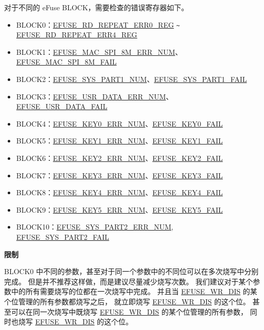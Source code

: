 \documentclass[main\_\_CN.tex]{subfiles}
\begin{document}
\begin{enumerate}
对于不同的 eFuse BLOCK，需要检查的错误寄存器如下。
\begin{itemize}
    \item BLOCK0：\hyperref[regdesc:EFUSERDREPEATERR0REG]{EFUSE\_RD\_REPEAT\_ERR0\_REG} \verb+~+ \hyperref[regdesc:EFUSERDREPEATERR4REG]{EFUSE\_RD\_REPEAT\_ERR4\_REG}
    \item BLOCK1：\hyperref[fielddesc:EFUSEMACSPI8MERRNUM]{EFUSE\_MAC\_SPI\_8M\_ERR\_NUM}、\hyperref[fielddesc:EFUSEMACSPI8MFAIL]{EFUSE\_MAC\_SPI\_8M\_FAIL}
    \item BLOCK2：\hyperref[fielddesc:EFUSESYSPART1NUM]{EFUSE\_SYS\_PART1\_NUM}、\hyperref[fielddesc:EFUSESYSPART1FAIL] {EFUSE\_SYS\_PART1\_FAIL}
    \item BLOCK3：\hyperref[fielddesc:EFUSEUSRDATAERRNUM] {EFUSE\_USR\_DATA\_ERR\_NUM}、\hyperref[fielddesc:EFUSEUSRDATAFAIL] {EFUSE\_USR\_DATA\_FAIL}
    \item BLOCK4：\hyperref[fielddesc:EFUSEKEY0ERRNUM] {EFUSE\_KEY0\_ERR\_NUM}、\hyperref[fielddesc:EFUSEKEY0FAIL] {EFUSE\_KEY0\_FAIL}
    \item BLOCK5：\hyperref[fielddesc:EFUSEKEY1ERRNUM] {EFUSE\_KEY1\_ERR\_NUM}、\hyperref[fielddesc:EFUSEKEY1FAIL] {EFUSE\_KEY1\_FAIL}
    \item BLOCK6：\hyperref[fielddesc:EFUSEKEY2ERRNUM] {EFUSE\_KEY2\_ERR\_NUM}、\hyperref[fielddesc:EFUSEKEY2FAIL] {EFUSE\_KEY2\_FAIL}
    \item BLOCK7：\hyperref[fielddesc:EFUSEKEY3ERRNUM] {EFUSE\_KEY3\_ERR\_NUM}、\hyperref[fielddesc:EFUSEKEY3FAIL] {EFUSE\_KEY3\_FAIL}
    \item BLOCK8：\hyperref[fielddesc:EFUSEKEY4ERRNUM] {EFUSE\_KEY4\_ERR\_NUM}、\hyperref[fielddesc:EFUSEKEY4FAIL] {EFUSE\_KEY4\_FAIL}
    \item BLOCK9：\hyperref[fielddesc:EFUSEKEY5ERRNUM] {EFUSE\_KEY5\_ERR\_NUM}、\hyperref[fielddesc:EFUSEKEY5FAIL] {EFUSE\_KEY5\_FAIL}
    \item BLOCK10：\hyperref[fielddesc:EFUSESYSPART2ERRNUM] {EFUSE\_SYS\_PART2\_ERR\_NUM}, \hyperref[fielddesc:EFUSESYSPART2FAIL] {EFUSE\_SYS\_PART2\_FAIL}
\end{itemize}
\end{enumerate}


{\bfseries 限制}

BLOCK0 中不同的参数，甚至对于同一个参数中的不同位可以在多次烧写中分别完成。
但是并不推荐这样做，而是建议尽量减少烧写次数。
我们建议对于某个参数中的所有需要烧写的位都在一次烧写中完成。
并且当 \hyperref[fielddesc:EFUSEWRDIS]{EFUSE\_WR\_DIS} 的某个位管理的所有参数都烧写之后，
就立即烧写 \hyperref[fielddesc:EFUSEWRDIS]{EFUSE\_WR\_DIS} 的这个位。
甚至可以在同一次烧写中既烧写 \hyperref[fielddesc:EFUSEWRDIS]{EFUSE\_WR\_DIS} 的某个位管理的所有参数，
同时也烧写 \hyperref[fielddesc:EFUSEWRDIS]{EFUSE\_WR\_DIS} 的这个位。
\end{document}
